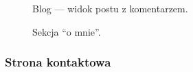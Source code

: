 \documentclass[a4paper, 12pt]{article}
\numberwithin{figure}{section}
\begin{document}
\begin{sloppypar}
\begin{figure}[H] 
    \centering
   \caption{Blog --- widok postu z komentarzem.}
   \vspace{-3mm}
   \label{fig:gotowa-aplikacja-8.jpg}
\end{figure}

\begin{figure}[H] 
    \centering
   \caption{Sekcja ``o mnie''.}
   \vspace{-3mm}
   \label{fig:gotowa-aplikacja-9.jpg}
\end{figure}

\subsubsection*{Strona kontaktowa}


\end{sloppypar}
\end{document}
